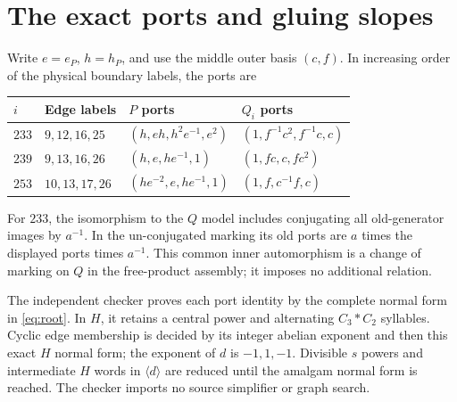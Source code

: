 \documentclass[11pt]{article}
\begin{document}
\section{The exact ports and gluing slopes}

Write $e=e_P$, $h=h_P$, and use the middle outer basis $(c,f)$.
In increasing order of the physical boundary labels, the ports are
\begin{center}
\begin{tabular}{llll}
\toprule
$i$ & Edge labels & $P$ ports & $Q_i$ ports\\
\midrule
$233$ & $9,12,16,25$ & $(h,eh,h^2e^{-1},e^2)$ &
$(1,f^{-1}c^2,f^{-1}c,c)$\\[3pt]
$239$ & $9,13,16,26$ & $(h,e,he^{-1},1)$ &
$(1,fc,c,fc^2)$\\[3pt]
$253$ & $10,13,17,26$ & $(he^{-2},e,he^{-1},1)$ &
$(1,f,c^{-1}f,c)$\\
\bottomrule
\end{tabular}
\end{center}
For $233$, the isomorphism to the $Q$ model includes conjugating all
old-generator images by $a^{-1}$. In the un-conjugated marking its old
ports are $a$ times the displayed ports times $a^{-1}$. This common inner
automorphism is a change of marking on $Q$ in the free-product assembly;
it imposes no additional relation.

The independent checker proves each port identity by the complete normal
form in \eqref{eq:root}. In $H$, it retains a central power and alternating
$C_3*C_2$ syllables. Cyclic edge membership is decided by its integer
abelian exponent and then this exact $H$ normal form; the exponent of $d$
is $-1,1,-1$. Divisible $s$ powers and intermediate $H$ words in
$\langle d\rangle$ are reduced until the amalgam normal form is reached.
The checker imports no source simplifier or graph search.
\end{document}
